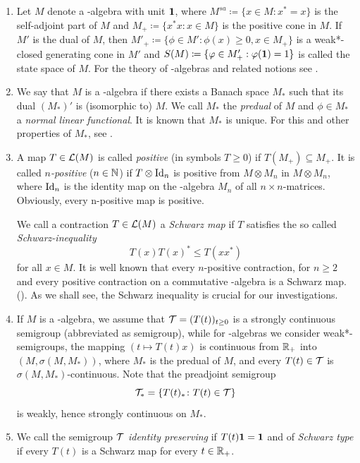 \begin{enumerate}[1., wide, labelsep=1em]

\item
Let $ M $ denote a \CA-algebra with unit $ \mathbf{1} $, where 
%
$
	M^{sa} \coloneq \{x \in M \colon x^{*} = x\} 
$
%
is the self-adjoint part of\/ $ M $ and 
%
$
	M_{+} \coloneq \{ x^{*}x \colon x \in M\} 
$
%
is the positive cone in $ M $.
If\/ $ M' $ is the dual of\/ $ M $, then 
%
$
	M'_{+} \coloneq \{\phi \in M' \colon \phi(x) \geq 0, x \in M_{+}\} 
$
%
is a weak*-closed generating cone in $ M' $ and 
%
$
	S(M) \coloneq \{\phi \in M'_{+}: \phi(\1) = 1\} 
$
%
is called the state space of\/ $ M $. 
For the theory of \CA-algebras and related notions see \textcite{pedersen:1979}.

\item
We say that $ M $ is a \WA-algebra if there exists a Banach space $ M_{*} $ such that its dual $ (M_{*})' $ is (isomorphic to) $ M $.
We call $ M_{*} $ the \emph{predual} of\/ $ M $ and $ \phi \in M_{*} $ a \emph{normal linear functional}.
It is known that $ M_{*} $ is unique. %
For this and other properties of\/ $M_{*} $, see \textcite[Chapter III]{takesaki:1979}.

\item
A map $ T \in \mathcal{L}(M) $ is called \emph{positive} (in symbols $ T \geq 0 $) if\/ $ T(M_{+}) \subseteq M_{+} $.
It is called \emph{$n$-positive} ($ n \in \mathbb{N} $) if\/ $ T \otimes \operatorname{Id} _{n} $ is positive from $ M \otimes M_{n} $ in $ M \otimes M_{n} $, where $ \operatorname{Id} _{n} $ is the identity map on the \CA-algebra $ M_{n} $ of all $ n \times n $-matrices.
Obviously, every n-positive map is positive.

We call a contraction $ T \in \mathcal{L}(M) $ a \emph{Schwarz map} if\/ $ T $ satisfies the so called \emph{Schwarz-inequality}
\[
	T(x)T(x)^{*} \leq T(xx^{*}) 
\]
for all $ x \in M $.
It is well known that every $n$-positive contraction, for $ n \geq 2 $ and every positive contraction on a commutative \CA-algebra is a Schwarz map. (\textcite[Chapter IV]{takesaki:1979}).%
As we shall see, the Schwarz inequality is crucial for our investigations.

\item 
If\/ $ M $ is a \CA-algebra, we assume that $ \TT = (T(t))_{t \geq 0} $ is a strongly continuous semigroup (abbreviated as semigroup), while for \WA-algebras we consider weak*-semigroups, \ie the mapping $ (t \mapsto T(t)x) $ is continuous from $ \mathbb{R}_{+} $ into $ (M,\sigma(M,M_{*}))$, where $ M_{*} $ is the predual of\/ $ M $, and every $ T(t) \in \mathcal{T} $ is $ \sigma(M,M_{*}) $-continuous.
Note that the preadjoint semigroup
\[
	\mathcal{T}_{*} = \{ T(t)_{*} \colon T(t) \in \mathcal{T} \}
\]
is weakly, hence strongly continuous on $ M_{*} $. 

\item
We call the semigroup $ \mathcal{T} $ \emph{identity preserving} if\/ $ T(t)\mathbf{1} = \mathbf{1} $ and of \emph{Schwarz type} if every $ T(t) $ is a Schwarz map for every $t \in \mathbb{R}_{+}$.

\end{enumerate}
